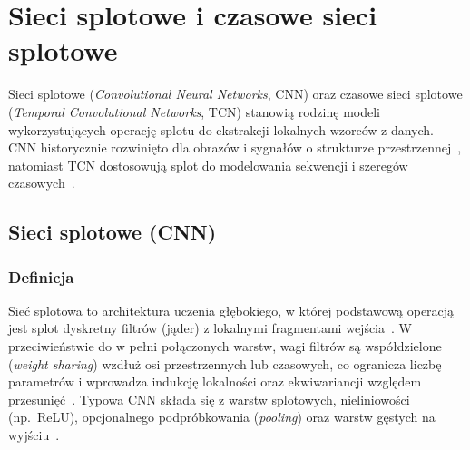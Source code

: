 %

\section{Sieci splotowe i czasowe sieci splotowe}
\label{sec:cnn-tcn}

Sieci splotowe (\emph{Convolutional Neural Networks}, CNN) oraz czasowe sieci splotowe
(\emph{Temporal Convolutional Networks}, TCN) stanowią rodzinę modeli wykorzystujących
operację splotu do ekstrakcji lokalnych wzorców z danych. CNN historycznie rozwinięto
dla obrazów i sygnałów o strukturze przestrzennej~\citep{lecun1998gradient,lecun2015deep},
natomiast TCN dostosowują splot do modelowania sekwencji i szeregów
czasowych~\citep{lea2017temporal,bai2018empirical}.

\subsection{Sieci splotowe (CNN)}
\label{sec:cnn}

\subsubsection{Definicja}
Sieć splotowa to architektura uczenia głębokiego, w której podstawową operacją jest
splot dyskretny filtrów (jąder) z lokalnymi fragmentami wejścia~\citep{lecun1998gradient}.
W przeciwieństwie do w pełni połączonych warstw, wagi filtrów są współdzielone
(\emph{weight sharing}) wzdłuż osi przestrzennych lub czasowych, co ogranicza liczbę
parametrów i wprowadza indukcję lokalności oraz ekwiwariancji względem
przesunięć~\citep{goodfellow2016deep}. Typowa CNN składa się z warstw splotowych,
nie\-li\-nio\-wo\-ści (np.\ ReLU), opcjonalnego podpróbkowania (\emph{pooling}) oraz warstw
gęstych na wyjściu~\citep{lecun2015deep}.


